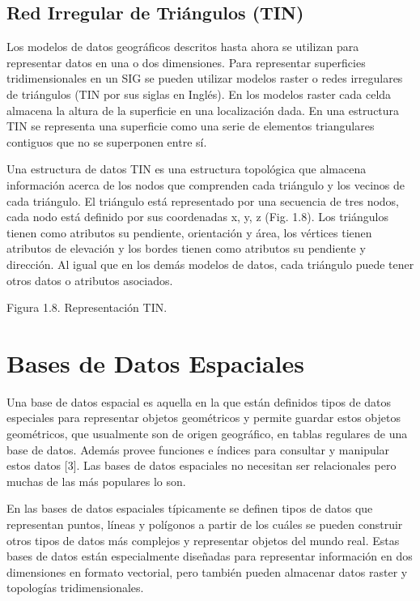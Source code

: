 \documentclass[final,fmstyle]{fpunathesis}
\begin{document}
\subsection{Red Irregular de Triángulos (TIN)}

Los modelos de datos geográficos descritos hasta ahora se utilizan para representar datos en una o dos dimensiones. Para representar superficies tridimensionales en un SIG se pueden utilizar modelos raster o redes irregulares de triángulos (TIN por sus siglas en Inglés). En los modelos raster cada celda almacena la altura de la superficie en una localización dada. En una estructura TIN se representa una superficie como una serie de elementos triangulares contiguos que no se superponen entre sí.

Una estructura de datos TIN es una estructura topológica que almacena información acerca de los nodos que comprenden cada triángulo y los vecinos de cada triángulo. El triángulo está representado por una secuencia de tres nodos, cada nodo está definido por sus coordenadas x, y, z (Fig. 1.8). Los triángulos tienen como atributos su pendiente, orientación y área, los vértices tienen atributos de elevación y los bordes tienen como atributos su pendiente y dirección. Al igual que en los demás modelos de datos, cada triángulo puede tener otros datos o atributos asociados.

Figura 1.8. Representación TIN.

\section{Bases de Datos Espaciales}

Una base de datos espacial es aquella en la que están definidos tipos de datos especiales para representar objetos geométricos y permite guardar estos objetos geométricos, que usualmente son de origen geográfico, en tablas regulares de una base de datos. Además provee funciones e índices para consultar y manipular estos datos [3]. Las bases de datos espaciales no necesitan ser relacionales pero muchas de las más populares lo son.

En las bases de datos espaciales típicamente se definen tipos de datos que representan puntos, líneas y polígonos a partir de los cuáles se pueden construir otros tipos de datos más complejos y representar objetos del mundo real. Estas bases de datos están especialmente diseñadas para representar información en dos dimensiones en formato vectorial, pero también pueden almacenar datos raster y topologías tridimensionales.
\end{document}
